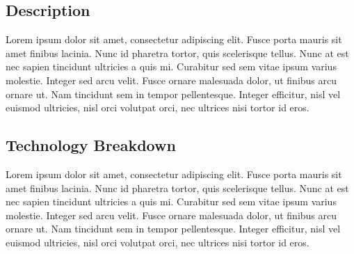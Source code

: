 \documentclass{article}
\begin{document}
\subsection{Description}\label{description}

Lorem ipsum dolor sit amet, consectetur adipiscing elit. Fusce porta
mauris sit amet finibus lacinia. Nunc id pharetra tortor, quis
scelerisque tellus. Nunc at est nec sapien tincidunt ultricies a quis
mi. Curabitur sed sem vitae ipsum varius molestie. Integer sed arcu
velit. Fusce ornare malesuada dolor, ut finibus arcu ornare ut. Nam
tincidunt sem in tempor pellentesque. Integer efficitur, nisl vel
euismod ultricies, nisl orci volutpat orci, nec ultrices nisi tortor id
eros.

\subsection{Technology Breakdown}\label{technology-breakdown}

Lorem ipsum dolor sit amet, consectetur adipiscing elit. Fusce porta
mauris sit amet finibus lacinia. Nunc id pharetra tortor, quis
scelerisque tellus. Nunc at est nec sapien tincidunt ultricies a quis
mi. Curabitur sed sem vitae ipsum varius molestie. Integer sed arcu
velit. Fusce ornare malesuada dolor, ut finibus arcu ornare ut. Nam
tincidunt sem in tempor pellentesque. Integer efficitur, nisl vel
euismod ultricies, nisl orci volutpat orci, nec ultrices nisi tortor id
eros.



\end{document}
